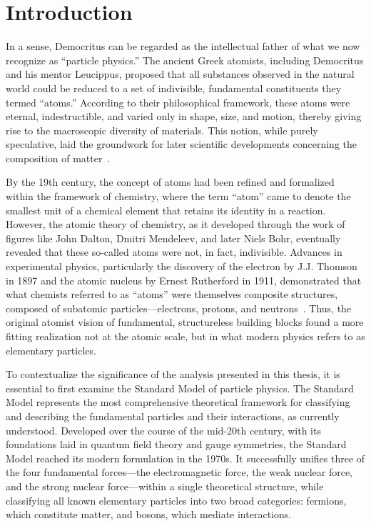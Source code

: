 \chapter{Introduction} \label{chap:chap-1}




In a sense, Democritus can be regarded as the intellectual father of what we now recognize as ``particle physics.'' The ancient Greek atomists, including Democritus and his mentor Leucippus, proposed that all substances observed in the natural world could be reduced to a set of indivisible, fundamental constituents they termed ``atoms.'' According to their philosophical framework, these atoms were eternal, indestructible, and varied only in shape, size, and motion, thereby giving rise to the macroscopic diversity of materials. This notion, while purely speculative, laid the groundwork for later scientific developments concerning the composition of matter~\cite{Griffiths:1987tj}.

By the 19th century, the concept of atoms had been refined and formalized within the framework of chemistry, where the term ``atom'' came to denote the smallest unit of a chemical element that retains its identity in a reaction. However, the atomic theory of chemistry, as it developed through the work of figures like John Dalton, Dmitri Mendeleev, and later Niels Bohr, eventually revealed that these so-called atoms were not, in fact, indivisible. Advances in experimental physics, particularly the discovery of the electron by J.J. Thomson in 1897 and the atomic nucleus by Ernest Rutherford in 1911, demonstrated that what chemists referred to as ``atoms'' were themselves composite structures, composed of subatomic particles—electrons, protons, and neutrons~\cite{Griffiths:1987tj}. Thus, the original atomist vision of fundamental, structureless building blocks found a more fitting realization not at the atomic scale, but in what modern physics refers to as elementary particles.

To contextualize the significance of the analysis presented in this thesis, it is essential to first examine the Standard Model of particle physics. The Standard Model represents the most comprehensive theoretical framework for classifying and describing the fundamental particles and their interactions, as currently understood. Developed over the course of the mid-20th century, with its foundations laid in quantum field theory and gauge symmetries, the Standard Model reached its modern formulation in the 1970s. It successfully unifies three of the four fundamental forces---the electromagnetic force, the weak nuclear force, and the strong nuclear force---within a single theoretical structure, while classifying all known elementary particles into two broad categories: fermions, which constitute matter, and bosons, which mediate interactions.

